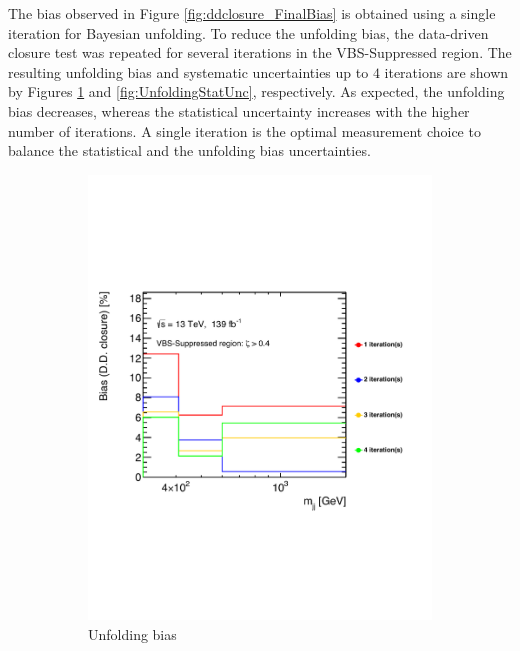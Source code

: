 The bias observed in Figure \ref{fig:ddclosure_FinalBias} is obtained using a single iteration for Bayesian unfolding. To reduce the unfolding bias, the data-driven closure test was repeated for several iterations in the VBS-Suppressed region. The resulting unfolding bias and systematic uncertainties up to $4$ iterations are shown by Figures \ref{fig:UnfoldingBiasIteration} and \ref{fig:UnfoldingStatUnc}, respectively. As expected, the unfolding bias decreases, whereas the statistical uncertainty increases with the higher number of iterations. A single iteration is the optimal measurement choice to balance the statistical and the unfolding bias uncertainties.

\begin{figure}[htb]
    \centering
    \begin{subfigure}{.49\textwidth}
        \centering
        \includegraphics[width=.92\linewidth]{figures/Analysis/Unfolding/UnfoldingBiasIteration.pdf}
       \caption{ Unfolding bias \label{fig:UnfoldingBiasIteration} }
    \end{subfigure}
    \begin{subfigure}{.49\textwidth}

\end{subfigure}
\end{figure}
